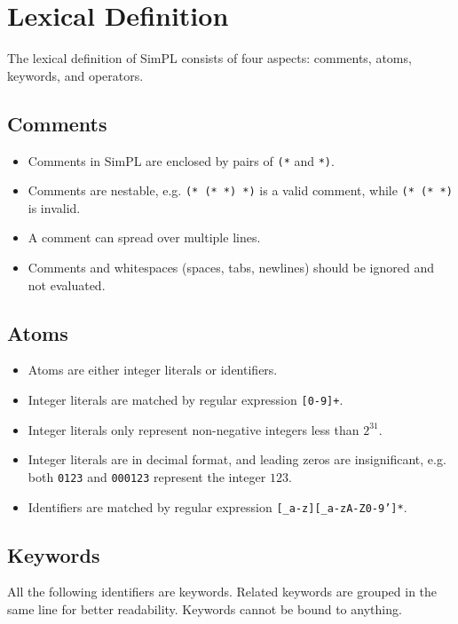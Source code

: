 \documentclass{article}
\begin{document}
\section{Lexical Definition}

The lexical definition of SimPL consists of four aspects: comments, atoms, keywords, and operators.

\subsection{Comments}

\begin{itemize}
  \item Comments in SimPL are enclosed by pairs of \texttt{(*} and \texttt{*)}.
  \item Comments are nestable, e.g. \texttt{(*  (*  *)  *)} is a valid comment, while \texttt{(*  (*  *)} is invalid.
  \item A comment can spread over multiple lines.
  \item Comments and whitespaces (spaces, tabs, newlines) should be ignored and not evaluated.
\end{itemize}

\subsection{Atoms}

\begin{itemize}
  \item Atoms are either integer literals or identifiers.
  \item Integer literals are matched by regular expression \texttt{[0-9]+}.
  \item Integer literals only represent non-negative integers less than $2^{31}$.
  \item Integer literals are in decimal format, and leading zeros are insignificant, e.g. both \texttt{0123} and \texttt{000123} represent the integer $123$.
  \item Identifiers are matched by regular expression \texttt{[\_a-z][\_a-zA-Z0-9']*}.
\end{itemize}

\subsection{Keywords}

All the following identifiers are keywords.
Related keywords are grouped in the same line for better readability.
Keywords cannot be bound to anything.
\end{document}

